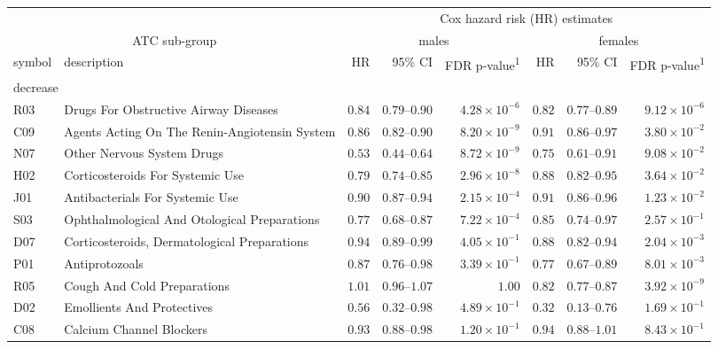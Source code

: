 \setlength{\LTpost}{0mm}
\begin{longtable}{llrrrrrr}
\toprule
 &  & \multicolumn{6}{c}{Cox hazard risk (HR) estimates} \\ 
\cmidrule(lr){3-8}
\multicolumn{2}{c}{ATC sub-group} & \multicolumn{3}{c}{males} & \multicolumn{3}{c}{females} \\ 
\cmidrule(lr){1-2} \cmidrule(lr){3-5} \cmidrule(lr){6-8}
symbol & description & HR & 95\% CI & FDR p-value\textsuperscript{1} & HR & 95\% CI & FDR p-value\textsuperscript{1} \\ 
\midrule
\multicolumn{8}{l}{decrease} \\ 
\midrule
R03 & Drugs For Obstructive Airway Diseases & $0.84$ & $0.79$–$0.90$ & $4.28 \times 10^{-6}$ & $0.82$ & $0.77$–$0.89$ & $9.12 \times 10^{-6}$ \\ 
C09 & Agents Acting On The Renin-Angiotensin System & $0.86$ & $0.82$–$0.90$ & $8.20 \times 10^{-9}$ & $0.91$ & $0.86$–$0.97$ & $3.80 \times 10^{-2}$ \\ 
N07 & Other Nervous System Drugs & $0.53$ & $0.44$–$0.64$ & $8.72 \times 10^{-9}$ & $0.75$ & $0.61$–$0.91$ & $9.08 \times 10^{-2}$ \\ 
H02 & Corticosteroids For Systemic Use & $0.79$ & $0.74$–$0.85$ & $2.96 \times 10^{-8}$ & $0.88$ & $0.82$–$0.95$ & $3.64 \times 10^{-2}$ \\ 
J01 & Antibacterials For Systemic Use & $0.90$ & $0.87$–$0.94$ & $2.15 \times 10^{-4}$ & $0.91$ & $0.86$–$0.96$ & $1.23 \times 10^{-2}$ \\ 
S03 & Ophthalmological And Otological Preparations & $0.77$ & $0.68$–$0.87$ & $7.22 \times 10^{-4}$ & $0.85$ & $0.74$–$0.97$ & $2.57 \times 10^{-1}$ \\ 
D07 & Corticosteroids, Dermatological Preparations & $0.94$ & $0.89$–$0.99$ & $4.05 \times 10^{-1}$ & $0.88$ & $0.82$–$0.94$ & $2.04 \times 10^{-3}$ \\ 
P01 & Antiprotozoals & $0.87$ & $0.76$–$0.98$ & $3.39 \times 10^{-1}$ & $0.77$ & $0.67$–$0.89$ & $8.01 \times 10^{-3}$ \\ 
R05 & Cough And Cold Preparations & $1.01$ & $0.96$–$1.07$ & $1.00$ & $0.82$ & $0.77$–$0.87$ & $3.92 \times 10^{-9}$ \\ 
D02 & Emollients And Protectives & $0.56$ & $0.32$–$0.98$ & $4.89 \times 10^{-1}$ & $0.32$ & $0.13$–$0.76$ & $1.69 \times 10^{-1}$ \\ 
C08 & Calcium Channel Blockers & $0.93$ & $0.88$–$0.98$ & $1.20 \times 10^{-1}$ & $0.94$ & $0.88$–$1.01$ & $8.43 \times 10^{-1}$ \\ 

\end{longtable}
